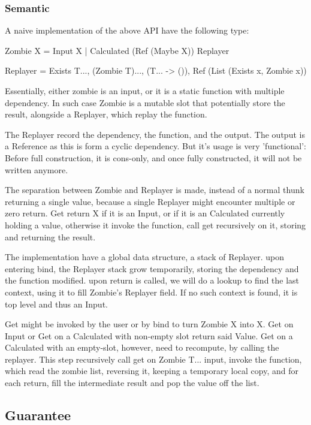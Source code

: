 \subsubsection{Semantic}


A naive implementation of the above API have the following type:

Zombie X = Input X | Calculated (Ref (Maybe X)) Replayer

Replayer = Exists T..., (Zombie T)..., (T... -> ()), Ref (List (Exists x, Zombie x))

Essentially, either zombie is an input, or it is a static function with multiple dependency.
In such case Zombie is a mutable slot that potentially store the result, alongside a Replayer, which replay the function.

The Replayer record the dependency, the function, and the output. The output is a Reference as this is form a cyclic dependency. But it's usage is very 'functional': Before full construction, it is cons-only, and once fully constructed, it will not be written anymore.

The separation between Zombie and Replayer is made, instead of a normal thunk returning a single value, because a single Replayer might encounter multiple or zero return.
Get return X if it is an Input, or if it is an Calculated currently holding a value, otherwise it invoke the function, call get recursively on it, storing and returning the result.

The implementation have a global data structure, a stack of Replayer. upon entering bind, the Replayer stack grow temporarily, storing the dependency and the function modified. upon return is called, we will do a lookup to find the last context, using it to fill Zombie's Replayer field. If no such context is found, it is top level and thus an Input.

Get might be invoked by the user or by bind to turn Zombie X into X. Get on Input or Get on a Calculated with non-empty slot return said Value. Get on a Calculated with an empty-slot, however, need to recompute, by calling the replayer. This step recursively call get on Zombie T... input, invoke the function, which read the zombie list, reversing it, keeping a temporary local copy, and for each return, fill the intermediate result and pop the value off the list.
\subsection{Guarantee}
